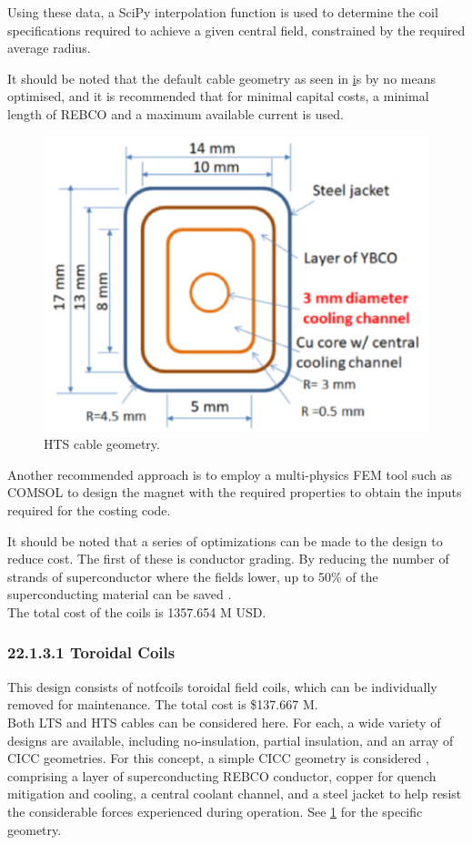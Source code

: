Using these data, a SciPy interpolation function is used to determine the coil specifications required to achieve a given central field, constrained by the required average radius.

It should be noted that the default cable geometry as seen in \href{fig:yuhu_cs} is by no means optimised, and it is recommended that for minimal capital costs, a minimal length of REBCO and a maximum available current is used.


\begin{figure}[h]
    \centering
    \includegraphics[width =0.5\linewidth]{StandardFigures/yuhu_cs.pdf}
    \caption{HTS cable geometry.}
    \label{fig:yuhu_cs}
\end{figure}

Another recommended approach is to employ a multi-physics FEM tool such as COMSOL to design the magnet with the required properties to obtain the inputs required for the costing code.

It should be noted that a series of optimizations can be made to the design to reduce cost. The first of these is conductor grading. By reducing the number of strands of superconductor where the fields lower, up to 50\% of the superconducting material can be saved \cite{uglietti2018progressing}.\\

The total cost of the coils is 1357.654 M USD.


\subsubsection*{22.1.3.1 Toroidal Coils}

This design consists of notfcoils toroidal field coils, which can be individually removed for maintenance. The total cost is \$137.667 M.\\

Both LTS and HTS cables can be considered here. For each, a wide variety of designs are available, including no-insulation, partial insulation, and an array of CICC geometries. For this concept, a simple CICC geometry is considered \cite{Menard2016}, comprising a layer of superconducting REBCO conductor, copper for quench mitigation and cooling, a central coolant channel, and a steel jacket to help resist the considerable forces experienced during operation. See \ref{fig:yuhu_cs} for the specific geometry.\\


